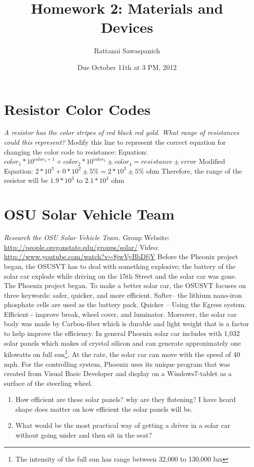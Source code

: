 \documentclass{article}
\title{Homework 2: Materials and Devices}
\author{Rattanai Sawaspanich}
\date{Due October 11th at 3 PM, 2012}
\newcommand{\tab}{\hspace*{3em}}
\begin{document}
\maketitle

\section{Resistor Color Codes}
\emph{A resistor has the color stripes of red black red gold. What range of resistances could this represent?}
\newline
Modify this line to represent the correct equation for changing the color code to resistance:\newline
Equation:  $color_{1}*10^{color_{3}+1}+color_{2}*10^{color_{3}} \pm color_{4}= resistance \pm error$\newline
Modified Equation:  $2*10^{3}+0*10^{2} \pm 5\% = 2*10^{3} \pm 5\%$  ohm \newline
Therefore, the range of the resistor will be $1.9*10^3$  to $ 2.1*10^3$ ohm

\section{OSU Solar Vehicle Team}
\emph{Research the OSU Solar Vehicle Team.}  \newline
Group Website:  \url{http://people.oregonstate.edu/groups/solar/}  \newline
Video:  \url{http://www.youtube.com/watch?v=8jwVyBbDfjY}\newline\newline
\tab Before the Pheonix project began, the OSUSVT has to deal with something explosive; the battery of the solar car explode while driving on the 15th Street and  the solar car was gone.  The Phoenix project began. To make a better solar car, the OSUSVT focuses on three keywords: safer, quicker, and more efficient.  Safter-- the lithium nano-iron phosphate cells are used as the battery pack. Quicker -- Using the Egress system. Efficient - improve break, wheel cover, and luminator. Moreover, the solar car body was made by Carbon-fiber which is durable and light weight that is a factor to help improve the efficiency.  In general Phoenix solar car includes with 1,032 solar panels which makes of crystal silicon and can generate approximately one kilowatts on full sun\footnote{The intensity of the full sun has range between 32,000 to 130,000 lux}.  At the rate, the solar car can move with the speed of 40 mph.  For the controlling system, Phoenix uses its unique program that was created from Visual Basic Developer and display on a Windows7-tablet as a surface of the steerling wheel.

\begin{enumerate}
\item How efficient are these solar panels?  why are they flatening? I have heard shape does matter on how efficient the solar panels will be.
\item What would be the most practical way of getting a driver in a solar car without going under and then sit in the seat?  

\end{enumerate}

\end{document}
